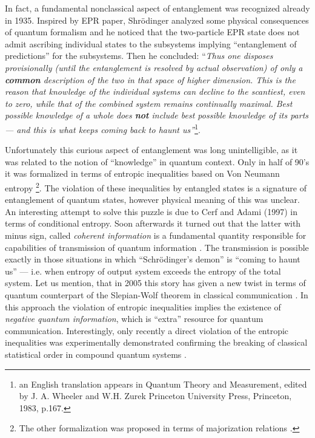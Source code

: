 \documentclass[twocolumn,aps,rmp]{revtex4}
\begin{document}
In fact, a fundamental nonclassical aspect of entanglement was
recognized already in 1935. Inspired by EPR paper, Shr{\"o}dinger
analyzed some physical consequences of quantum formalism and he
noticed that the two-particle EPR state does not admit ascribing
individual states to the subsystems implying ``entanglement of
predictions'' for the subsystems. Then he concluded: {``\it Thus one
  disposes provisionally (until the entanglement is resolved by actual
  observation) of only a {\bf common} description of the two in that space
  of higher dimension. This is the reason that knowledge of the
  individual systems can decline to the scantiest, even to zero, while
  that of the combined system remains continually maximal. Best
  possible knowledge of a whole does {\bf not} include best possible
  knowledge of its parts --- and this is what keeps coming back to
  haunt us''}\cite{Schrodinger}\footnote{an English
translation appears in Quantum Theory and Measurement,
edited by J. A. Wheeler and W.H. Zurek Princeton University
Press, Princeton, 1983, p.167.}.

Unfortunately this curious aspect of entanglement was long
unintelligible, as it was related to the notion of ``knowledge'' in
quantum context. Only in half of 90's it was formalized in terms of
entropic inequalities based on Von Neumann entropy \cite
{RPH1994,alpha,cerfadami}\footnote {The other formalization was
  proposed in terms of majorization relations \cite
  {NielsenKempe}.}. The violation of these inequalities by entangled
states is a signature of entanglement of quantum states, however
physical meaning of this was unclear. An interesting attempt to solve
this puzzle is due to Cerf and Adami (1997)
in terms of conditional entropy. Soon afterwards it turned out that
the latter with minus sign, called {\it coherent information} is a
fundamental quantity responsible for capabilities of transmission of
quantum information \cite{SchumacherN-1996-pra,Lloyd-cap}. The
transmission is possible exactly in those situations in which
``Schr{\"o}dinger's demon'' is ``coming to haunt us'' --- i.e. when
entropy of output system exceeds the entropy of the total system.  Let
us mention, that in 2005 this story has given a new twist in terms of
quantum counterpart of the Slepian-Wolf theorem in classical
communication \cite {SW-nature,sw-long}. In this approach the
violation of entropic inequalities implies the existence of {\it
  negative quantum information}, which is ``extra'' resource for
quantum communication. Interestingly, only recently a direct violation
of the entropic inequalities was experimentally demonstrated
confirming the breaking of classical statistical order in compound
quantum systems \cite{NonlinExp}.
\end{document}
